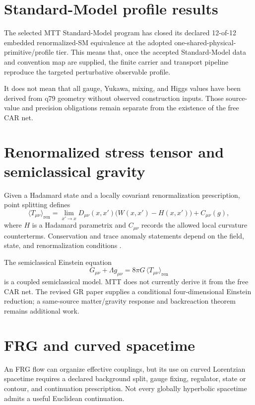 \documentclass[11pt]{article}
\theoremstyle{definition}
\theoremstyle{remark}
\begin{document}
\section{Standard-Model profile results}

The selected MTT Standard-Model program has closed its declared 12-of-12
embedded renormalized-SM equivalence at the adopted one-shared-physical-
primitive/profile tier. This means that, once the accepted Standard-Model
data and convention map are supplied, the finite carrier and transport
pipeline reproduce the targeted perturbative observable profile.

It does not mean that all gauge, Yukawa, mixing, and Higgs values have been
derived from q79 geometry without observed construction inputs. Those
source-value and precision obligations remain separate from the existence of
the free CAR net.

\section{Renormalized stress tensor and semiclassical gravity}

Given a Hadamard state and a locally covariant renormalization prescription,
point splitting defines
\[
 \langle T_{\mu\nu}\rangle_{\mathrm{ren}}
 =
 \lim_{x'\to x}
 D_{\mu\nu}(x,x')
 \bigl(W(x,x')-H(x,x')\bigr)
 +C_{\mu\nu}(g),
\]
where \(H\) is a Hadamard parametrix and \(C_{\mu\nu}\) records the allowed
local curvature counterterms. Conservation and trace anomaly statements
depend on the field, state, and renormalization conditions
\cite{Wald,HollandsWald}.

The semiclassical Einstein equation
\[
 G_{\mu\nu}+\Lambda g_{\mu\nu}
 =
 8\pi G\,\langle T_{\mu\nu}\rangle_{\mathrm{ren}}
\]
is a coupled semiclassical model. MTT does not currently derive it from the
free CAR net. The revised GR paper supplies a conditional four-dimensional
Einstein reduction; a same-source matter/gravity response and backreaction
theorem remains additional work.

\section{FRG and curved spacetime}

An FRG flow can organize effective couplings, but its use on curved
Lorentzian spacetime requires a declared background split, gauge fixing,
regulator, state or contour, and continuation prescription. Not every
globally hyperbolic spacetime admits a useful Euclidean continuation.
\end{document}
